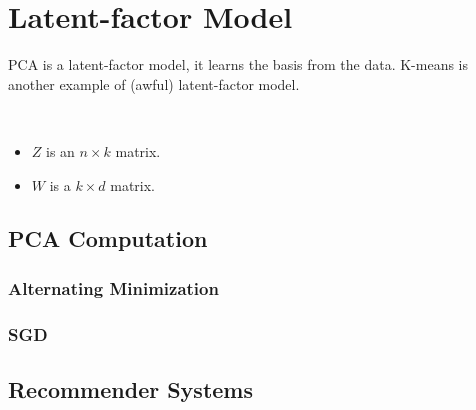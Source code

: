 \setcounter{chapter}{3}
\chapter{Latent-factor Model}
PCA is a latent-factor model, it learns the basis from the data. K-means is another example of (awful) latent-factor model.

\begin{notation} ~
    \begin{itemize}
        \item $Z$ is an $n \times k$ matrix.
        \item $W$ is a $k \times d$ matrix.
    \end{itemize}
\end{notation}


\section{PCA Computation} \label{sec:}
\subsection{Alternating Minimization} \label{sec:}

\subsection{SGD} \label{sec:}

\section{Recommender Systems} \label{sec:}

